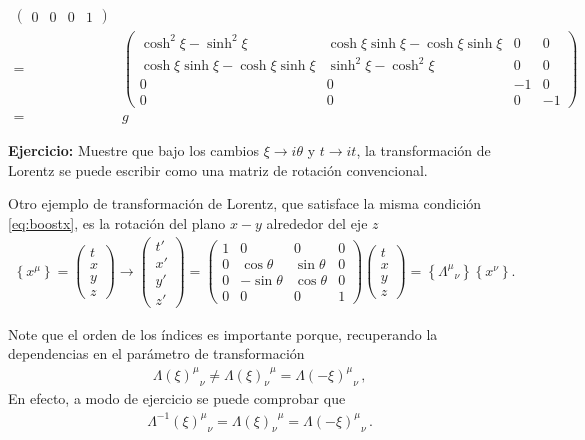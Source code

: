 \begin{frame}
\begin{align}
\begin{pmatrix}
    0     &  0  &0&1
  \end{pmatrix}\nonumber\\
  =&\begin{pmatrix}
       \cosh^2\xi-\sinh^2\xi&\cosh\xi\sinh\xi-\cosh\xi\sinh\xi&0&0\\
    \cosh\xi\sinh\xi-\cosh\xi\sinh\xi&\sinh^2\xi-\cosh^2\xi&0&0\\
    0     &  0  &-1&0\\
    0     &  0  &0&-1
  \end{pmatrix}\nonumber\\
=&g
\end{align}
\end{frame}

\textbf{Ejercicio:} Muestre que bajo los cambios $\xi\to i\theta$ y $t\to it$, la transformación de Lorentz se puede escribir como una matriz de rotación convencional.

Otro ejemplo de transformación de Lorentz, que satisface la misma condición \eqref{eq:boostx}, es la rotación del plano $x-y$ alrededor del eje $z$
\begin{align}
    \left\{x^\mu\right\}=\begin{pmatrix}
    t\\
    x\\
    y\\
    z
  \end{pmatrix}\to
  \begin{pmatrix}
    t'\\
    x'\\
    y'\\
    z'
  \end{pmatrix}= 
  \begin{pmatrix}
    1     &0&0&0\\
    0     &\cos\theta&\sin\theta&0\\
    0     & -\sin\theta  &\cos\theta&0\\
    0     &  0  &0&1
  \end{pmatrix}
  \begin{pmatrix}
    t\\
    x\\
    y\\
    z
  \end{pmatrix}
=\left\{{\Lambda^\mu}_{\nu}\right\}\left\{x^\nu\right\}.
\end{align}

Note que el orden de los índices es importante porque, recuperando la dependencias en el parámetro de transformación
\begin{align}
  {\Lambda(\xi)^{\mu}}_{\nu}\ne {\Lambda(\xi)_{\nu}}^{\mu}={\Lambda(-\xi)^{\mu}}_{\nu}\,,
\end{align}
En efecto, a modo de ejercicio se puede comprobar que
\begin{align}
{\Lambda^{-1}(\xi)^{\mu}}_{\nu} ={\Lambda(\xi)_{\nu}}^{\mu}= {\Lambda(-\xi)^{\mu}}_{\nu}\,.
\end{align}


